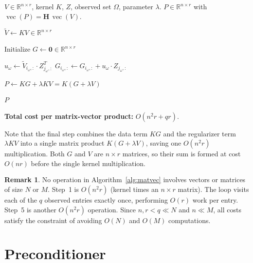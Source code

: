 \documentclass[12pt]{article}
\theoremstyle{definition}
\newtheorem{remark}[theorem]{Remark}
\DeclareMathOperator{\vecop}{vec}
\begin{document}
\begin{algorithm}
\caption{Matrix-Vector Product $p \leftarrow \mathbf{H}\,\vecop(V)$}
\label{alg:matvec}
\begin{algorithmic}[1]
  \Require $V \in \mathbb{R}^{n \times r}$, kernel $K$, $Z$, observed set $\Omega$,
           parameter $\lambda$.
  \Ensure  $P \in \mathbb{R}^{n \times r}$ with $\vecop(P) = \mathbf{H}\,\vecop(V)$.

  \State $\widetilde{V} \leftarrow KV \in \mathbb{R}^{n \times r}$

  \State Initialize $G \leftarrow \mathbf{0} \in \mathbb{R}^{n \times r}$

    \State $u_\omega \leftarrow \widetilde{V}_{i_\omega,:} \cdot Z_{j_\omega,:}^T$
    \State $G_{i_\omega,:} \leftarrow G_{i_\omega,:} + u_\omega \cdot Z_{j_\omega,:}$
  \EndFor  {}

  \State $P \leftarrow K G + \lambda K V = K(G + \lambda V)$

  \State \Return $P$
\end{algorithmic}
\end{algorithm}

\noindent
\textbf{Total cost per matrix-vector product:} $O(n^2 r + qr)$.

Note that the final step combines the data term $KG$ and the regularizer term $\lambda KV$ into
a single matrix product $K(G + \lambda V)$, saving one $O(n^2 r)$ multiplication.  Both $G$
and $V$ are $n \times r$ matrices, so their sum is formed at cost $O(nr)$ before the single
kernel multiplication.

\begin{remark}
  No operation in Algorithm~\ref{alg:matvec} involves vectors or matrices of size $N$ or $M$.
  Step~1 is $O(n^2 r)$ (kernel times an $n \times r$ matrix).  The loop visits each of the
  $q$ observed entries exactly once, performing $O(r)$ work per entry.  Step~5 is another
  $O(n^2 r)$ operation.  Since $n, r < q \ll N$ and $n \ll M$, all costs satisfy the
  constraint of avoiding $O(N)$ and $O(M)$ computations.
\end{remark}

\section{Preconditioner}
\end{document}
